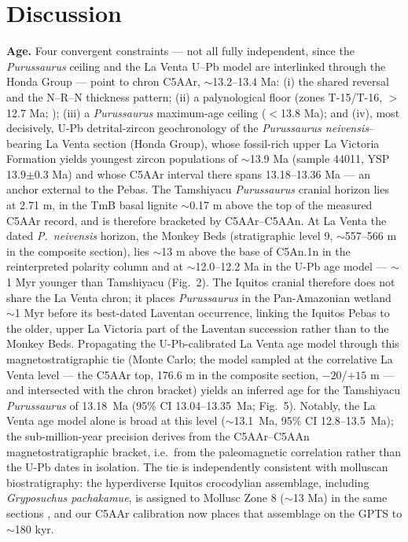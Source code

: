 \documentclass[12pt]{article}
\begin{document}
\section*{Discussion}
\textbf{Age.} Four convergent constraints --- not all fully independent, since the
\textit{Purussaurus} ceiling and the La Venta U--Pb model are interlinked through the Honda
Group --- point to chron C5AAr, $\sim$13.2--13.4 Ma:
(i) the shared reversal and the N--R--N thickness pattern; (ii) a palynological floor
(zones T-15/T-16, $>$12.7 Ma; \citealp{Jaramillo2011}); (iii) a \textit{Purussaurus}
maximum-age ceiling ($<$13.8 Ma); and (iv), most decisively, U-Pb detrital-zircon
geochronology of the \textit{Purussaurus neivensis}--bearing La Venta section (Honda Group),
whose fossil-rich upper La Victoria Formation yields youngest zircon populations of
$\sim$13.9 Ma (sample 44011, YSP 13.9$\pm$0.3 Ma) and whose C5AAr interval there spans
13.18--13.36 Ma \citep{MoraRojas2023} --- an anchor external to the Pebas. The Tamshiyacu \textit{Purussaurus}
cranial horizon lies at 2.71 m, in the TmB basal lignite $\sim$0.17 m above the top of the measured
C5AAr record, and is therefore bracketed by C5AAr--C5AAn. At La Venta
the dated \textit{P.~neivensis} horizon, the Monkey Beds (stratigraphic level 9, $\sim$557--566 m in the
composite section), lies $\sim$13 m above the base of C5An.1n in the reinterpreted polarity column
and at $\sim$12.0--12.2 Ma in the U-Pb age model \citep{MoraRojas2023} --- $\sim$1 Myr younger than
Tamshiyacu (Fig.~2). The Iquitos cranial therefore does not share the La Venta chron; it places
\textit{Purussaurus} in the Pan-Amazonian wetland $\sim$1 Myr before its best-dated Laventan
occurrence, linking the Iquitos Pebas to the older, upper La Victoria part of the Laventan
succession rather than to the Monkey Beds. Propagating the U-Pb-calibrated La Venta age model through
this magnetostratigraphic tie (Monte Carlo; the model sampled at the correlative La Venta level
--- the C5AAr top, 176.6 m in the composite section, $-20$/$+15$ m --- and intersected with the
chron bracket) yields an inferred age for the Tamshiyacu \textit{Purussaurus}
of 13.18~Ma (95\% CI 13.04--13.35~Ma; Fig.~5). Notably, the La Venta age model alone is broad at this
level ($\sim$13.1~Ma, 95\% CI 12.8--13.5~Ma); the sub-million-year precision derives from the
C5AAr--C5AAn magnetostratigraphic bracket, i.e.\ from the paleomagnetic correlation rather than
the U-Pb dates in isolation. The
tie is independently consistent with molluscan biostratigraphy: the hyperdiverse Iquitos
crocodylian assemblage, including \textit{Gryposuchus pachakamue}, is assigned to Mollusc
Zone 8 ($\sim$13 Ma) in the same sections \citep{SalasGismondi2016}, and our C5AAr
calibration now places that assemblage on the GPTS to $\sim$180 kyr.
\end{document}
